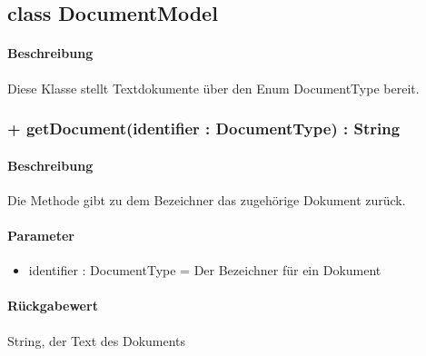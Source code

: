 \subsection{class DocumentModel}
\paragraph*{Beschreibung}
Diese Klasse stellt Textdokumente über den Enum DocumentType bereit.

\subsubsection{+ getDocument(identifier : DocumentType) : String}%
\paragraph*{Beschreibung}
Die Methode gibt zu dem Bezeichner das zugehörige Dokument zurück.
\paragraph*{Parameter}
\begin{itemize}
    \item identifier : DocumentType = Der Bezeichner für ein Dokument
\end{itemize}
\paragraph*{Rückgabewert}
String, der Text des Dokuments
